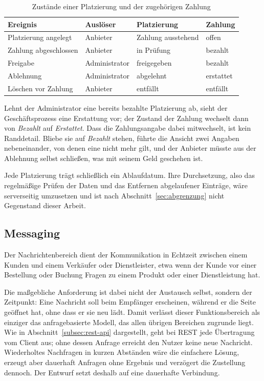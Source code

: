 \begin{table}[htbp]
\centering
\small
\begin{tabular}{|p{3.4cm}|p{2.2cm}|p{3.0cm}|p{3.0cm}|}
\hline
\textbf{Ereignis} & \textbf{Auslöser} & \textbf{Platzierung} &
\textbf{Zahlung} \\
\hline
Platzierung angelegt & Anbieter & Zahlung ausstehend & offen \\
\hline
Zahlung abgeschlossen & Anbieter & in Prüfung & bezahlt \\
\hline
Freigabe & Administrator & freigegeben & bezahlt \\
\hline
Ablehnung & Administrator & abgelehnt & erstattet \\
\hline
Löschen vor Zahlung & Anbieter & entfällt & entfällt \\
\hline
\end{tabular}
\caption{Zustände einer Platzierung und der zugehörigen Zahlung}
\label{tab:werbung_ablauf}
\end{table}
Lehnt der Administrator eine bereits bezahlte Platzierung ab, sieht
der Geschäftsprozess eine Erstattung vor; der Zustand der Zahlung
wechselt dann von \textit{Bezahlt} auf \textit{Erstattet}. Dass die
Zahlungsangabe dabei mitwechselt, ist kein Randdetail. Bliebe sie auf
\textit{Bezahlt} stehen, führte die Ansicht zwei Angaben
nebeneinander, von denen eine nicht mehr gilt, und der Anbieter
müsste aus der Ablehnung selbst schließen, was mit seinem Geld
geschehen ist.

Jede Platzierung trägt schließlich ein Ablaufdatum. Ihre Durchsetzung, also das regelmäßige Prüfen der Daten und das
Entfernen abgelaufener Einträge, wäre serverseitig umzusetzen und ist
nach Abschnitt~\ref{sec:abgrenzung} nicht Gegenstand dieser Arbeit.


\subsection{Messaging}
\label{subsec:messaging_konzept}

Der Nachrichtenbereich dient der Kommunikation in Echtzeit zwischen
einem Kunden und einem Verkäufer oder Dienstleister, etwa wenn der
Kunde vor einer Bestellung oder Buchung Fragen zu einem Produkt oder
einer Dienstleistung hat.

Die maßgebliche Anforderung ist dabei nicht der Austausch selbst,
sondern der Zeitpunkt: Eine Nachricht soll beim Empfänger erscheinen,
während er die Seite geöffnet hat, ohne dass er sie neu lädt. Damit
verlässt dieser Funktionsbereich als einziger das anfragebasierte
Modell, das allen übrigen Bereichen zugrunde liegt. Wie in
Abschnitt~\ref{subsec:rest-api} dargestellt, geht bei \acs{REST} jede
Übertragung vom Client aus; ohne dessen Anfrage erreicht den Nutzer
keine neue Nachricht. Wiederholtes Nachfragen in kurzen Abständen wäre
die einfachere Lösung, erzeugt aber dauerhaft Anfragen ohne Ergebnis
und verzögert die Zustellung dennoch. Der Entwurf setzt deshalb auf
eine dauerhafte Verbindung.

